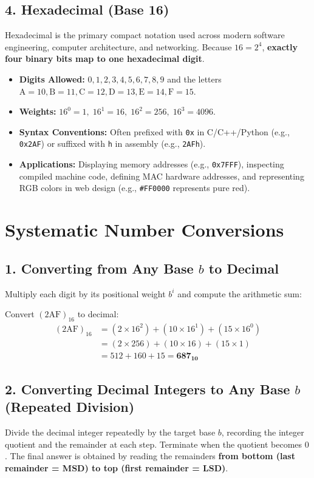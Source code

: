 \subsection{4. Hexadecimal (Base 16)}
Hexadecimal is the primary compact notation used across modern software engineering, computer architecture, and networking. Because $16 = 2^4$, \textbf{exactly four binary bits map to one hexadecimal digit}.
\begin{itemize}[leftmargin=1.2em]
    \item \textbf{Digits Allowed:} $0, 1, 2, 3, 4, 5, 6, 7, 8, 9$ and the letters $\text{A}=10, \text{B}=11, \text{C}=12, \text{D}=13, \text{E}=14, \text{F}=15$.
    \item \textbf{Weights:} $16^0 = 1, \; 16^1 = 16, \; 16^2 = 256, \; 16^3 = 4096$.
    \item \textbf{Syntax Conventions:} Often prefixed with \texttt{0x} in C/C++/Python (e.g., \texttt{0x2AF}) or suffixed with \texttt{h} in assembly (e.g., \texttt{2AFh}).
    \item \textbf{Applications:} Displaying memory addresses (e.g., \texttt{0x7FFF}), inspecting compiled machine code, defining MAC hardware addresses, and representing RGB colors in web design (e.g., \texttt{\#FF0000} represents pure red).
\end{itemize}

\section{Systematic Number Conversions}

\subsection{1. Converting from Any Base $b$ to Decimal}
Multiply each digit by its positional weight $b^i$ and compute the arithmetic sum:
\begin{example}
Convert $(2\text{AF})_{16}$ to decimal:
\begin{align*}
(2\text{AF})_{16} &= (2 \times 16^2) + (10 \times 16^1) + (15 \times 16^0) \\
&= (2 \times 256) + (10 \times 16) + (15 \times 1) \\
&= 512 + 160 + 15 = \mathbf{687_{10}}
\end{align*}
\end{example}

\subsection{2. Converting Decimal Integers to Any Base $b$ (Repeated Division)}
Divide the decimal integer repeatedly by the target base $b$, recording the integer quotient and the remainder at each step. Terminate when the quotient becomes $0$. The final answer is obtained by reading the remainders \textbf{from bottom (last remainder = MSD) to top (first remainder = LSD)}.

